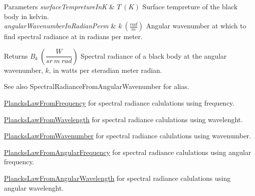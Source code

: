 \begin{DoxyParams}{Parameters}
{\em surface\+Tempreture\+InK} & $T\ (K)$ Surface tempreture of the black body in kelvin. \\
\hline
{\em angular\+Wavenumber\+In\+Radian\+Perm} & $k\ (\frac{rad}{m})$ Angular wavenumber at which to find spectral radiance at in radians per meter. \\
\hline
\end{DoxyParams}
\begin{DoxyReturn}{Returns}
$B_{k}\ ( \dfrac{W}{sr\ m\ rad})$ Spectral radiance of a black body at the angular wavenumber, $k$, in watts per steradian meter radian. 
\end{DoxyReturn}
\begin{DoxySeeAlso}{See also}
Spectral\+Radiance\+From\+Angular\+Wavenumber for alias. 

\mbox{\hyperlink{group___e_g_x_phys-_electrodynamics-_black_body-_plancks_law_ga68aae82f8a086831358c4a61c8c80ba4}{Plancks\+Law\+From\+Frequency}} for spectral radiance calulations using frequency. 

\mbox{\hyperlink{group___e_g_x_phys-_electrodynamics-_black_body-_plancks_law_ga54639bc031ded51ef78aa82b0457a4dd}{Plancks\+Law\+From\+Wavelength}} for spectral radiance calulations using wavelenght. 

\mbox{\hyperlink{group___e_g_x_phys-_electrodynamics-_black_body-_plancks_law_ga6648ae2a0fbff6735c1e1a04c7cac746}{Plancks\+Law\+From\+Wavenumber}} for spectral radiance calulations using wavenumber. 

\mbox{\hyperlink{group___e_g_x_phys-_electrodynamics-_black_body-_plancks_law_gaac540560c71e30c02b91d22e417b5863}{Plancks\+Law\+From\+Angular\+Frequency}} for spectral radiance calulations using angular frequency. 

\mbox{\hyperlink{group___e_g_x_phys-_electrodynamics-_black_body-_plancks_law_ga7322124727f968d28807e918c5eeb23f}{Plancks\+Law\+From\+Angular\+Wavelength}} for spectral radiance calulations using angular wavelenght. 
\end{DoxySeeAlso}
\mbox{\label{group___e_g_x_phys-_electrodynamics-_black_body-_plancks_law_ga68aae82f8a086831358c4a61c8c80ba4}} 
